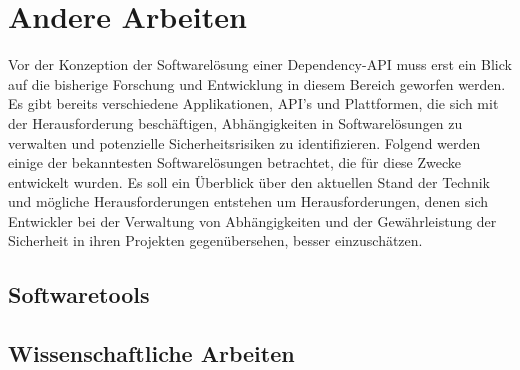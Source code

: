 \section{Andere Arbeiten} \label{sec:Andere}
    Vor der Konzeption der Softwarelösung einer Dependency-\ac{API} muss erst ein Blick auf die bisherige Forschung und Entwicklung in diesem Bereich geworfen werden.
    Es gibt bereits verschiedene Applikationen, \ac{API}'s und Plattformen, die sich mit der Herausforderung beschäftigen, Abhängigkeiten in Softwarelösungen zu verwalten und potenzielle Sicherheitsrisiken zu identifizieren.
    Folgend werden einige der bekanntesten Softwarelösungen betrachtet, die für diese Zwecke entwickelt wurden.
    Es soll ein Überblick über den aktuellen Stand der Technik und mögliche Herausforderungen entstehen um Herausforderungen, denen sich Entwickler bei der Verwaltung von Abhängigkeiten und der Gewährleistung der Sicherheit in ihren Projekten gegenübersehen, besser einzuschätzen.
    \subsection{Softwaretools} \label{subsec:Softwaretools}
    
    
    
    
    \subsection{Wissenschaftliche Arbeiten} \label{subsec:Wiss_Arbeiten}
    
    
    